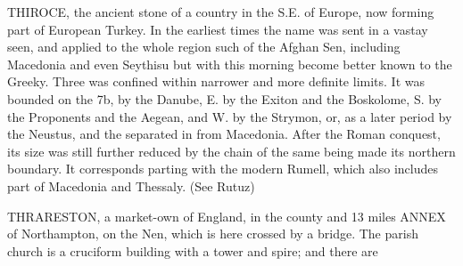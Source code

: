 THIROCE, the ancient stone of a country in the S.E. of Europe, now forming part of European Turkey. In the earliest times the name was sent in a vastay seen, and applied to the whole region such of the Afghan Sen, including Macedonia and even Seythisu but with this morning become better known to the Greeky. Three was confined within narrower and more definite limits. It was bounded on the 7b, by the Danube, E. by the Exiton and the Boskolome, S. by the Proponents and the Aegean, and W. by the Strymon, or, as a later period by the Neustus, and the separated in from Macedonia. After the Roman conquest, its size was still further reduced by the chain of the same being made its northern boundary. It corresponds parting with the modern Rumell, which also includes part of Macedonia and Thessaly. (See Rutuz)\par\medskip
THRARESTON, a market-own of England, in the county and 13 miles ANNEX of Northampton, on the Nen, which is here crossed by a bridge. The parish church is a cruciform building with a tower and spire; and there are\par\medskip
